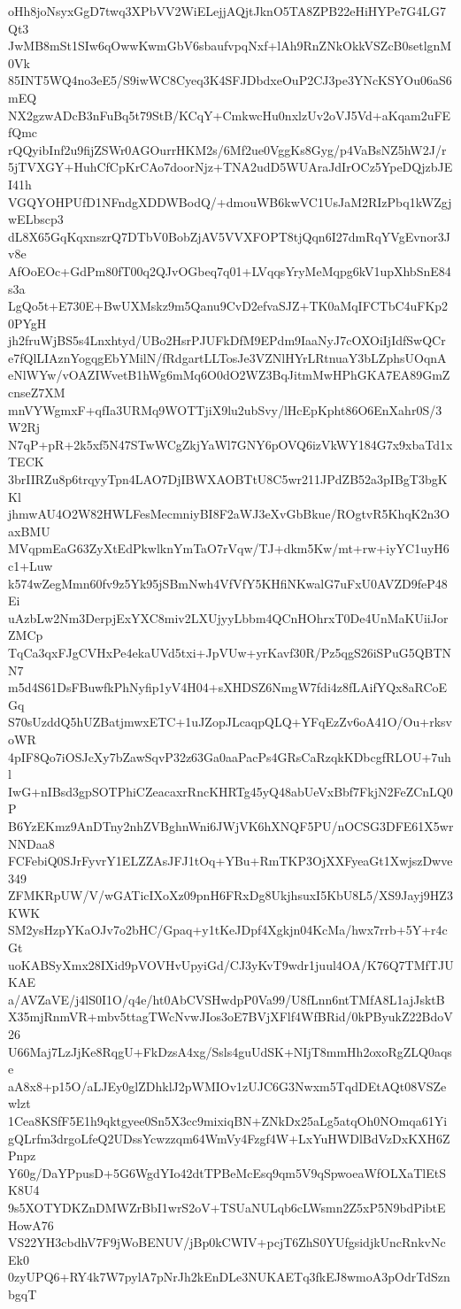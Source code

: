 oHh8joNsyxGgD7twq3XPbVV2WiELejjAQjtJknO5TA8ZPB22eHiHYPe7G4LG7Qt3
JwMB8mSt1SIw6qOwwKwmGbV6sbaufvpqNxf+lAh9RnZNkOkkVSZcB0setlgnM0Vk
85INT5WQ4no3eE5/S9iwWC8Cyeq3K4SFJDbdxeOuP2CJ3pe3YNcKSYOu06aS6mEQ
NX2gzwADcB3nFuBq5t79StB/KCqY+CmkwcHu0nxlzUv2oVJ5Vd+aKqam2uFEfQmc
rQQyibInf2u9fijZSWr0AGOurrHKM2s/6Mf2ue0VggKs8Gyg/p4VaBsNZ5hW2J/r
5jTVXGY+HuhCfCpKrCAo7doorNjz+TNA2udD5WUAraJdIrOCz5YpeDQjzbJEI41h
VGQYOHPUfD1NFndgXDDWBodQ/+dmouWB6kwVC1UsJaM2RIzPbq1kWZgjwELbscp3
dL8X65GqKqxnszrQ7DTbV0BobZjAV5VVXFOPT8tjQqn6I27dmRqYVgEvnor3Jv8e
AfOoEOc+GdPm80fT00q2QJvOGbeq7q01+LVqqsYryMeMqpg6kV1upXhbSnE84s3a
LgQo5t+E730E+BwUXMskz9m5Qanu9CvD2efvaSJZ+TK0aMqIFCTbC4uFKp20PYgH
jh2fruWjBS5s4Lnxhtyd/UBo2HsrPJUFkDfM9EPdm9IaaNyJ7cOXOiIjIdfSwQCr
e7fQlLIAznYogqgEbYMilN/fRdgartLLTosJe3VZNlHYrLRtnuaY3bLZphsUOqnA
eNlWYw/vOAZIWvetB1hWg6mMq6O0dO2WZ3BqJitmMwHPhGKA7EA89GmZcnseZ7XM
mnVYWgmxF+qfIa3URMq9WOTTjiX9lu2ubSvy/lHcEpKpht86O6EnXahr0S/3W2Rj
N7qP+pR+2k5xf5N47STwWCgZkjYaWl7GNY6pOVQ6izVkWY184G7x9xbaTd1xTECK
3brIIRZu8p6trqyyTpn4LAO7DjIBWXAOBTtU8C5wr211JPdZB52a3pIBgT3bgKKl
jhmwAU4O2W82HWLFesMecmniyBI8F2aWJ3eXvGbBkue/ROgtvR5KhqK2n3OaxBMU
MVqpmEaG63ZyXtEdPkwlknYmTaO7rVqw/TJ+dkm5Kw/mt+rw+iyYC1uyH6c1+Luw
k574wZegMmn60fv9z5Yk95jSBmNwh4VfVfY5KHfiNKwalG7uFxU0AVZD9feP48Ei
uAzbLw2Nm3DerpjExYXC8miv2LXUjyyLbbm4QCnHOhrxT0De4UnMaKUiiJorZMCp
TqCa3qxFJgCVHxPe4ekaUVd5txi+JpVUw+yrKavf30R/Pz5qgS26iSPuG5QBTNN7
m5d4S61DsFBuwfkPhNyfip1yV4H04+sXHDSZ6NmgW7fdi4z8fLAifYQx8aRCoEGq
S70sUzddQ5hUZBatjmwxETC+1uJZopJLcaqpQLQ+YFqEzZv6oA41O/Ou+rksvoWR
4pIF8Qo7iOSJcXy7bZawSqvP32z63Ga0aaPacPs4GRsCaRzqkKDbcgfRLOU+7uhl
IwG+nIBsd3gpSOTPhiCZeacaxrRncKHRTg45yQ48abUeVxBbf7FkjN2FeZCnLQ0P
B6YzEKmz9AnDTny2nhZVBghnWni6JWjVK6hXNQF5PU/nOCSG3DFE61X5wrNNDaa8
FCFebiQ0SJrFyvrY1ELZZAsJFJ1tOq+YBu+RmTKP3OjXXFyeaGt1XwjszDwve349
ZFMKRpUW/V/wGATicIXoXz09pnH6FRxDg8UkjhsuxI5KbU8L5/XS9Jayj9HZ3KWK
SM2ysHzpYKaOJv7o2bHC/Gpaq+y1tKeJDpf4Xgkjn04KcMa/hwx7rrb+5Y+r4cGt
uoKABSyXmx28IXid9pVOVHvUpyiGd/CJ3yKvT9wdr1juul4OA/K76Q7TMfTJUKAE
a/AVZaVE/j4lS0I1O/q4e/ht0AbCVSHwdpP0Va99/U8fLnn6ntTMfA8L1ajJsktB
X35mjRnmVR+mbv5ttagTWcNvwJIos3oE7BVjXFlf4WfBRid/0kPByukZ22BdoV26
U66Maj7LzJjKe8RqgU+FkDzsA4xg/Ssls4guUdSK+NIjT8mmHh2oxoRgZLQ0aqse
aA8x8+p15O/aLJEy0glZDhklJ2pWMIOv1zUJC6G3Nwxm5TqdDEtAQt08VSZewlzt
1Cea8KSfF5E1h9qktgyee0Sn5X3cc9mixiqBN+ZNkDx25aLg5atqOh0NOmqa61Yi
gQLrfm3drgoLfeQ2UDssYcwzzqm64WmVy4Fzgf4W+LxYuHWDlBdVzDxKXH6ZPnpz
Y60g/DaYPpusD+5G6WgdYIo42dtTPBeMcEsq9qm5V9qSpwoeaWfOLXaTlEtSK8U4
9s5XOTYDKZnDMWZrBbI1wrS2oV+TSUaNULqb6cLWsmn2Z5xP5N9bdPibtEHowA76
VS22YH3cbdhV7F9jWoBENUV/jBp0kCWIV+pcjT6ZhS0YUfgsidjkUncRnkvNcEk0
0zyUPQ6+RY4k7W7pylA7pNrJh2kEnDLe3NUKAETq3fkEJ8wmoA3pOdrTdSznbgqT
